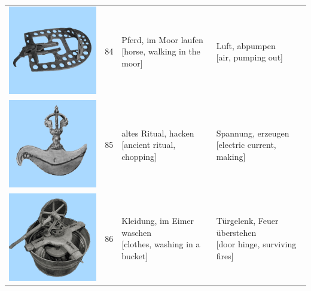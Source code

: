 \documentclass[
  english,
  doc,12pt,twoside,floatsintext]{apa7}
\begin{document}
\begin{center}
\begin{ThreePartTable}
{\begin{longtable}{llll}
\includegraphics[valign=c, scale=0.23]{../materials/unfamiliar/84.png} & 84 & \makecell[l]{Pferd, im Moor laufen\\{[horse, walking in the moor]}} & \makecell[l]{Luft, abpumpen\\{[air, pumping out]}}\\
\includegraphics[valign=c, scale=0.23]{../materials/unfamiliar/85.png} & 85 & \makecell[l]{altes Ritual, hacken\\{[ancient ritual, chopping]}} & \makecell[l]{Spannung, erzeugen\\{[electric current, making]}}\\
\includegraphics[valign=c, scale=0.23]{../materials/unfamiliar/86.png} & 86 & \makecell[l]{Kleidung, im Eimer waschen\\{[clothes, washing in a bucket]}} & \makecell[l]{Türgelenk, Feuer überstehen\\{[door hinge, surviving fires]}}\\

\end{longtable}}
\end{ThreePartTable}
\end{center}
\end{document}

